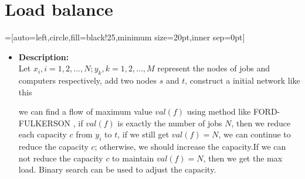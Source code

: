 \section{Load balance}
=[auto=left,circle,fill=black!25,minimum size=20pt,inner sep=0pt]

\begin{itemize}
	\item \textbf{Description:} \\
		Let $x_i, i = 1,2,..., N;y_k, k = 1,2,...,M$ represent the nodes of jobs and computers respectively, add two nodes $s$ and $t$, construct a initial network like this 
	\begin{center} 
	\end{center} 
	we can find a flow of maximum value $val(f)$ using method like FORD-FULKERSON ,
	if $val(f)$ is exactly the number of jobs $N$, then we reduce each capacity $c$ from $y_i$ to $t$,   if we still get $val(f) = N$, we can continue to reduce the capacity $c$;
	otherwise, we should increase the capacity.If we can not reduce the capacity $c$
	to maintain $val(f) = N$, then we get the max load.
	Binary search can be used to adjust the capacity.  
		

\end{itemize}
